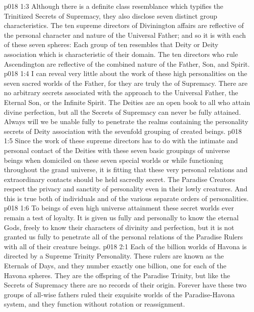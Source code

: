 \vs p018 1:3 Although there is a definite class resemblance which typifies the Trinitized Secrets of Supremacy, they also disclose seven distinct group characteristics. The ten supreme directors of Divinington affairs are reflective of the personal character and nature of the Universal Father; and so it is with each of these seven spheres: Each group of ten resembles that Deity or Deity association which is characteristic of their domain. The ten directors who rule Ascendington are reflective of the combined nature of the Father, Son, and Spirit.
\vs p018 1:4 \pc I can reveal very little about the work of these high personalities on the seven sacred worlds of the Father, for they are truly the  of Supremacy. There are no arbitrary secrets associated with the approach to the Universal Father, the Eternal Son, or the Infinite Spirit. The Deities are an open book to all who attain divine perfection, but all the Secrets of Supremacy can never be fully attained. Always will we be unable fully to penetrate the realms containing the personality secrets of Deity association with the sevenfold grouping of created beings.
\vs p018 1:5 Since the work of these supreme directors has to do with the intimate and personal contact of the Deities with these seven basic groupings of universe beings when domiciled on these seven special worlds or while functioning throughout the grand universe, it is fitting that these very personal relations and extraordinary contacts should be held sacredly secret. The Paradise Creators respect the privacy and sanctity of personality even in their lowly creatures. And this is true both of individuals and of the various separate orders of personalities.
\vs p018 1:6 To beings of even high universe attainment these secret worlds ever remain a test of loyalty. It is given us fully and personally to know the eternal Gods, freely to know their characters of divinity and perfection, but it is not granted us fully to penetrate all of the personal relations of the Paradise Rulers with all of their creature beings.
\vs p018 2:1 Each of the billion worlds of Havona is directed by a Supreme Trinity Personality. These rulers are known as the Eternals of Days, and they number exactly one billion, one for each of the Havona spheres. They are the offspring of the Paradise Trinity, but like the Secrets of Supremacy there are no records of their origin. Forever have these two groups of all\hyp{}wise fathers ruled their exquisite worlds of the Paradise\hyp{}Havona system, and they function without rotation or reassignment.

